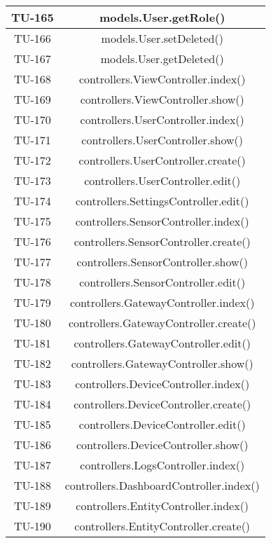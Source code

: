 \begin{center}
\begin{longtable}{|c|c|}
			\hline
			TU-165 & models.User.getRole() \\
			\hline
			TU-166 & models.User.setDeleted() \\
			\hline
			TU-167 & models.User.getDeleted() \\
			\hline
			TU-168 & controllers.ViewController.index() \\
			\hline
			TU-169 & controllers.ViewController.show() \\
			\hline
			TU-170 & controllers.UserController.index() \\
			\hline
			TU-171 & controllers.UserController.show() \\
			\hline
			TU-172 & controllers.UserController.create() \\
			\hline
			TU-173 & controllers.UserController.edit() \\
			\hline
			TU-174 & controllers.SettingsController.edit() \\
			\hline
			TU-175 & controllers.SensorController.index() \\
			\hline
			TU-176 & controllers.SensorController.create() \\
			\hline
			TU-177 & controllers.SensorController.show() \\
			\hline
			TU-178 & controllers.SensorController.edit() \\
			\hline
			TU-179 & controllers.GatewayController.index() \\
			\hline
			TU-180 & controllers.GatewayController.create() \\
			\hline
			TU-181 & controllers.GatewayController.edit() \\
			\hline
			TU-182 & controllers.GatewayController.show() \\
			\hline
			TU-183 & controllers.DeviceController.index() \\
			\hline
			TU-184 & controllers.DeviceController.create() \\
			\hline
			TU-185 & controllers.DeviceController.edit() \\
			\hline
			TU-186 & controllers.DeviceController.show() \\
			\hline
			TU-187 & controllers.LogsController.index() \\
			\hline
			TU-188 & controllers.DashboardController.index() \\
			\hline
			TU-189 & controllers.EntityController.index() \\
			\hline
			TU-190 & controllers.EntityController.create() \\

\end{longtable}
\end{center}
